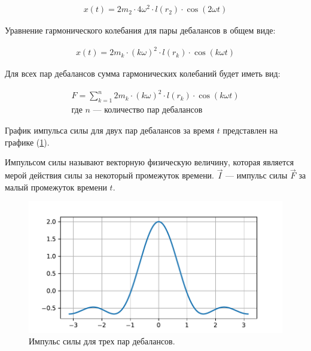 \begin{equation*}
    \begin{aligned}
        x(t) = 2 m_2 \cdot 4 \omega^2 \cdot l(r_2) \cdot \cos (2 \omega t)
    \end{aligned}
\end{equation*}

Уравнение гармонического колебания для пары дебалансов в общем виде:

\begin{equation}\label{eq:harmonic_common}
    \begin{aligned}
        x(t) = 2 m_k \cdot (k \omega)^2 \cdot l(r_k) \cdot \cos (k \omega t)
    \end{aligned}
\end{equation}

Для всех пар дебалансов сумма гармонических колебаний будет иметь вид:

\begin{equation}\label{eq:harmonic_sum}
    \begin{gathered}
        F = \sum\limits_{k = 1}^n 2 m_k \cdot (k \omega)^2 \cdot l(r_k) \cdot \cos (k \omega t) \\
        \textrm{где $n$ --- количество пар дебалансов} 
    \end{gathered}
\end{equation}

График импульса силы для двух пар дебалансов за время $t$ представлен на графике (\ref{grap:impulse}).

\begin{definition}
    Импульсом силы называют векторную физическую величину, которая является мерой действия силы за некоторый промежуток времени. $\vec{I}$ --- импульс силы $\vec{F}$ за малый промежуток времени $t$.
\end{definition}

\begin{figure}[h]
    \centering
    \includegraphics[width=1\linewidth]{grap/impulse.pdf}
    \caption{Импульс силы для трех пар дебалансов.}
    \label{grap:impulse}
\end{figure}


